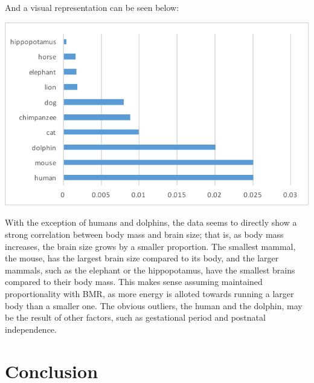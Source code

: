 \documentclass[10pt,letterpaper]{article}
\begin{document}
			And a visual representation can be seen below:
			\newline \newline
			\centerline{\includegraphics{Picture10.pdf}}
			\newline \newline
			With the exception of humans and dolphins, the data seems to directly show a strong correlation between body mass and brain size; that is, as body mass increases, the brain size grows by a smaller proportion. The smallest mammal, the mouse, has the largest brain size compared to its body, and the larger mammals, such as the elephant or the hippopotamus, have the smallest brains compared to their body mass. This makes sense assuming maintained proportionality with BMR, as more energy is alloted towards running a larger body than a smaller one. The obvious outliers, the human and the dolphin, may be the result of other factors, such as gestational period and postnatal independence. 
	\section{Conclusion}
		
\end{document}

